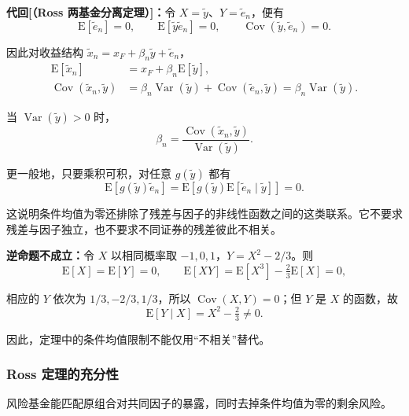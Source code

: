 \textbf{代回[（Ross 两基金分离定理）]：}令 $X=\tilde y$、$Y=\tilde e_n$，便有
\[
 \mathrm E[\tilde e_n]=0,\qquad
 \mathrm E[\tilde y\tilde e_n]=0,\qquad
 \operatorname{Cov}(\tilde y,\tilde e_n)=0.
\]

因此对收益结构 $\tilde x_n=x_F+\beta_n\tilde y+\tilde e_n$，
\[
\begin{aligned}
 \mathrm E[\tilde x_n]&=x_F+\beta_n\mathrm E[\tilde y],\\
 \operatorname{Cov}(\tilde x_n,\tilde y)
 &=\beta_n\operatorname{Var}(\tilde y)
   +\operatorname{Cov}(\tilde e_n,\tilde y)
 =\beta_n\operatorname{Var}(\tilde y).
\end{aligned}
\]

当 $\operatorname{Var}(\tilde y)>0$ 时，
\[
 \beta_n=\frac{\operatorname{Cov}(\tilde x_n,\tilde y)}
                   {\operatorname{Var}(\tilde y)}.
\]

更一般地，只要乘积可积，对任意 $g(\tilde y)$ 都有
\[
 \mathrm E[g(\tilde y)\tilde e_n]
 =\mathrm E\!\left[g(\tilde y)\mathrm E[\tilde e_n\mid\tilde y]\right]=0.
\]

这说明条件均值为零还排除了残差与因子的非线性函数之间的这类联系。它不要求残差与因子独立，也不要求不同证券的残差彼此不相关。

\textbf{逆命题不成立：}令 $X$ 以相同概率取 $-1,0,1$，$Y=X^2-2/3$。则
\[
 \mathrm E[X]=\mathrm E[Y]=0,\qquad
 \mathrm E[XY]=\mathrm E[X^3]-\tfrac23\mathrm E[X]=0,
\]

相应的 $Y$ 依次为 $1/3,-2/3,1/3$，所以 $\operatorname{Cov}(X,Y)=0$；但 $Y$ 是 $X$ 的函数，故
\[
 \mathrm E[Y\mid X]=X^2-\tfrac23\ne0.
\]

因此，定理中的条件均值限制不能仅用“不相关”替代。

\subsubsection{Ross 定理的充分性}
风险基金能匹配原组合对共同因子的暴露，同时去掉条件均值为零的剩余风险。

